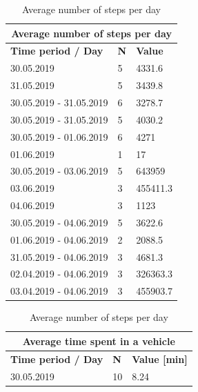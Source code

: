 \begin{table}[]
	\parbox{.45\linewidth}{
		\centering
		\begin{tabular}{|l|l|l|}
			\hline
			\multicolumn{3}{|c|}{\textbf{Average number of steps per day}}     \\ \hline
			\textbf{Time period / Day} & \textbf{N} & \textbf{Value}           \\ \hline
			30.05.2019                 & 5          & 4331.6                   \\ \hline
			31.05.2019                 & 5          & 3439.8                   \\ \hline
			30.05.2019 - 31.05.2019    & 6          & 3278.7                   \\ \hline
			30.05.2019 - 31.05.2019    & 5          & 4030.2                   \\ \hline
			30.05.2019 - 01.06.2019    & 6          & 4271                     \\ \hline
			01.06.2019                 & 1          & 17                       \\ \hline
			30.05.2019 - 03.06.2019    & 5          & 643959                   \\ \hline
			03.06.2019                 & 3          & 455411.3                 \\ \hline
			04.06.2019                 & 3          & 1123                     \\ \hline
			30.05.2019 - 04.06.2019    & 5          & 3622.6                   \\ \hline
			01.06.2019 - 04.06.2019    & 2          & 2088.5                   \\ \hline
			31.05.2019 - 04.06.2019    & 3          & 4681.3                   \\ \hline
			02.04.2019 - 04.06.2019    & 3          & 326363.3                 \\ \hline
			03.04.2019 - 04.06.2019    & 3          & 455903.7                 \\ \hline
		\end{tabular}
		\label{results-steps}
		\caption{Average number of steps per day}
	}
	\hfill
	\parbox{.45\linewidth}{
		\begin{tabular}{|l|l|l|}
			\hline
			\multicolumn{3}{|c|}{\textbf{Average time spent in a vehicle}}     \\ \hline
			\textbf{Time period / Day} & \textbf{N} & \textbf{Value {[}min{]}} \\ \hline
			30.05.2019                 & 10         & 8.24                     \\ \hline

\end{tabular}}
\end{table}
